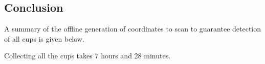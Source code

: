 \subsection{Conclusion}
A summary of the offline generation of coordinates to scan to guarantee detection of all cups is given below.




Collecting all the cups takes 7 hours and 28 minutes.
